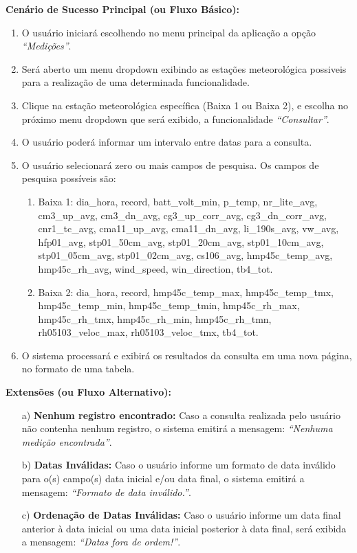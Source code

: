 \begin{quadro}[H]
\begin{framed}
\begin{flushleft}
		\textbf{Cenário de Sucesso Principal (ou Fluxo Básico):}\\
			\begin{enumerate}
				\item{O usuário iniciará escolhendo no menu principal da aplicação a opção \textit{``Medições''}.}
				\item{Será aberto um menu dropdown exibindo as estações meteorológica possiveis para a realização de uma determinada funcionalidade.}
				\item{Clique na estação meteorológica específica (Baixa 1 ou Baixa 2), e escolha no próximo menu dropdown que será exibido, a funcionalidade \textit{``Consultar''}.}
			 	\item O usuário poderá informar um intervalo entre datas para a consulta.
			 	\item O usuário selecionará zero ou mais campos de pesquisa. Os campos de pesquisa possíveis são:
				\begin{enumerate}
					\item Baixa 1: {dia\_hora, record, batt\_volt\_min, p\_temp, nr\_lite\_avg, cm3\_up\_avg, cm3\_dn\_avg, cg3\_up\_corr\_avg, cg3\_dn\_corr\_avg, cnr1\_tc\_avg, cma11\_up\_avg, cma11\_dn\_avg, li\_190s\_avg, vw\_avg, hfp01\_avg, stp01\_50cm\_avg, stp01\_20cm\_avg, stp01\_10cm\_avg, stp01\_05cm\_avg, stp01\_02cm\_avg, cs106\_avg, hmp45c\_temp\_avg, hmp45c\_rh\_avg, wind\_speed, win\_direction, tb4\_tot.}
					\item Baixa 2:  {dia\_hora, record, hmp45c\_temp\_max, hmp45c\_temp\_tmx, hmp45c\_temp\_min, hmp45c\_temp\_tmin, hmp45c\_rh\_max, hmp45c\_rh\_tmx, hmp45c\_rh\_min, hmp45c\_rh\_tmn, rh05103\_veloc\_max, rh05103\_veloc\_tmx, tb4\_tot.}
				\end{enumerate}
			 	\item{O sistema processará e exibirá os resultados da consulta em uma nova página, no formato de uma tabela.}
			 \end{enumerate}

		\textbf{Extensões (ou Fluxo Alternativo):}
		\begin{itemize}
			\item[a)] \textbf{Nenhum registro encontrado:} Caso a consulta realizada pelo usuário não contenha nenhum registro, o sistema emitirá a mensagem: \textit{``Nenhuma medição encontrada''}.
			\item[b)] \textbf{Datas Inválidas:} Caso o usuário informe um formato de data inválido para o(s) campo(s) data inicial e/ou data final, o sistema emitirá a mensagem: \textit{``Formato de data inválido.''}.
			\item[c)] \textbf{Ordenação de Datas Inválidas:} Caso o usuário informe um data final anterior à data inicial ou uma data inicial posterior à data final, será exibida a mensagem: \textit{``Datas fora de ordem!''}.
		\end{itemize}


\end{flushleft}
\end{framed}
\end{quadro}
